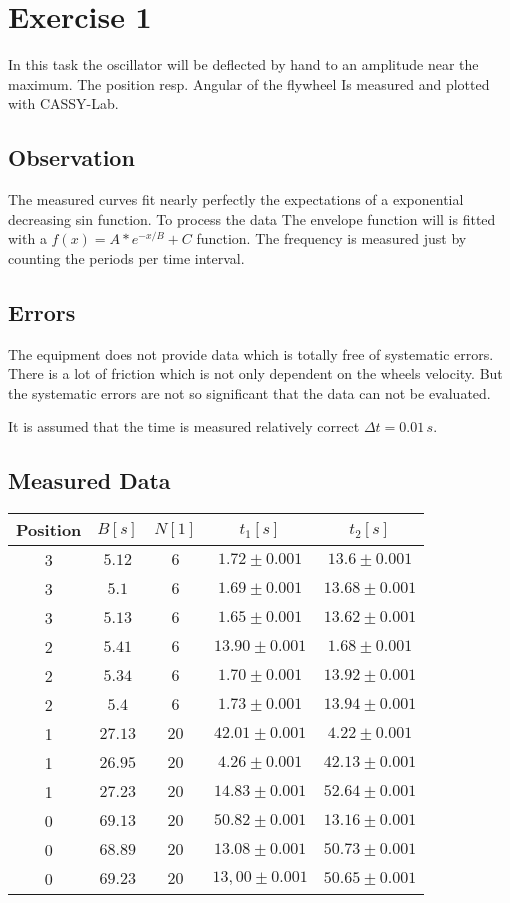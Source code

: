 \newpage
\section{Exercise 1}
In this task the oscillator will be deflected by hand to an amplitude near the maximum. The position resp. Angular of the flywheel Is measured and plotted with CASSY-Lab. 
\subsection{Observation}
The measured curves fit nearly perfectly the expectations of a exponential decreasing sin function. To process the data The envelope function will is fitted with a \(f(x)=A*e^{-x/B}+C\) function. The frequency  is measured just by counting the periods per time interval.
\subsection{Errors}
The equipment does not provide data which is totally free of systematic errors. There is a lot of friction which is not only dependent on the wheels velocity. But the systematic errors are not so significant that the data can not be evaluated.

It is assumed that the time is measured relatively correct \(\Delta t = 0.01\, s\). 
\subsection{Measured Data}
\begin{center}
\begin{tabular}{c|cccc}
Position & \(B [s]\) & \(N [1]\) & \(t_1 [s]\) & \(t_2 [s]\) \\ \hline
3 & \(5.12\) & \(6\) & \(1.72 \pm 0.001\) & \(13.6 \pm 0.001\) \\ 
3 & \(5.1\) & \(6\) & \(1.69 \pm 0.001\) & \(13.68 \pm 0.001\) \\ 
3 & \(5.13\) & \(6\) & \(1.65 \pm 0.001\) & \(13.62 \pm 0.001\) \\ 
2 & \(5.41\) & \(6\) & \(13.90 \pm 0.001\) & \(1.68 \pm 0.001\) \\ 
2 & \(5.34\) & \(6\) & \(1.70 \pm 0.001\) & \(13.92 \pm 0.001\) \\ 
2 & \(5.4\) & \(6\) & \(1.73 \pm 0.001\) & \(13.94 \pm 0.001\) \\ 
1 & \(27.13\) & \(20\) & \(42.01 \pm 0.001\) & \(4.22 \pm 0.001\) \\ 
1 & \(26.95\) & \(20\) & \(4.26 \pm 0.001\) & \(42.13 \pm 0.001\) \\ 
1 & \(27.23\) & \(20\) & \(14.83 \pm 0.001\) & \(52.64 \pm 0.001\) \\ 
0 & \(69.13\) & \(20\) & \(50.82 \pm 0.001\) & \(13.16 \pm 0.001\) \\ 
0 & \(68.89\) & \(20\) & \(13.08 \pm 0.001\) & \(50.73 \pm 0.001\) \\ 
0 & \(69.23\) & \(20\) & \(13,00 \pm 0.001\) & \(50.65 \pm 0.001\) \\ 
\end{tabular}
\end{center}

